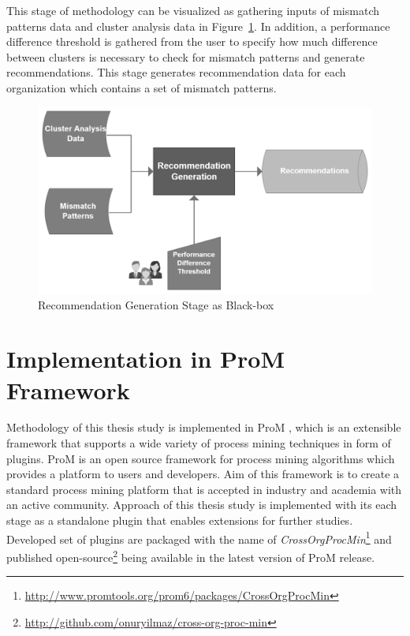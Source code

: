 This stage of methodology can be visualized as gathering inputs of mismatch patterns data and cluster analysis data in Figure~\ref{fig:recommendation-generation-blackox}. In addition, a performance difference threshold is gathered from the user to specify how much difference between clusters is necessary to check for mismatch patterns and generate recommendations. This stage generates recommendation data for each organization which contains a set of mismatch patterns.
\begin{figure}
  \centering
  \includegraphics[width=\textwidth]{4_methodology/recommendation-generation-blackbox}
  \caption{Recommendation Generation Stage as Black-box}
  \label{fig:recommendation-generation-blackox}
\end{figure}

\pagebreak
\section{Implementation in ProM Framework}
\label{sec:implementation}
Methodology of this thesis study is implemented in ProM \cite{verbeek2010prom}, which is an extensible framework that supports a wide variety of process mining techniques in form of plugins. ProM is an open source framework for process mining algorithms which provides a platform to users and developers. Aim of this framework is to create a standard process mining platform that is accepted in industry and academia with an active community. Approach of this thesis study is implemented with its each stage as a standalone plugin that enables extensions for further studies. Developed set of plugins are packaged with the name of \textit{CrossOrgProcMin}\footnote{\url{http://www.promtools.org/prom6/packages/CrossOrgProcMin}} and published open-source\footnote{\url{http://github.com/onuryilmaz/cross-org-proc-min}} being available in the latest version of ProM release. 

